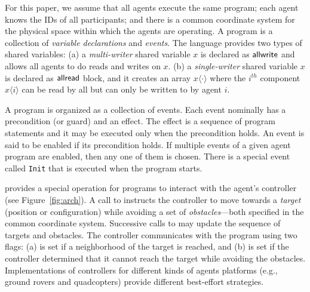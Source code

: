 For this paper, we assume that all agents execute the same \rolang program; each agent knows the IDs of all participants; and there is a common coordinate system for the physical space within which the agents are operating. 
%
A program is a collection of \emph{variable declarations} and \emph{events}. 
The language provides two types of shared variables:
(a) a {\em multi-writer} shared variable $x$ is declared as $\sf{allwrite}$ and allows all agents to do reads and writes on $x$. 
(b) a {\em single-writer\/} shared variable $x$ is declared as $\sf{allread}$ block, and it 
creates an array $x\langle \cdot \rangle$ 
where the $i^{th}$ component $x \langle i \rangle$ can be read by all but can only be written to by agent $i$.

A \rolang program is organized as a collection of events. Each event nominally has a precondition (or guard) and an effect. The effect is a sequence of program statements and it may be executed only when the precondition holds. An event is said to be enabled if its precondition holds. If multiple events of a given agent program are enabled, then any one of them is chosen.  
%
%
%
%
There is a special event called \verb|Init|
that is executed when the program starts. 
 
\rolang provides a special operation  for programs to interact with the agent's controller (see Figure~\ref{fig:arch}). 
A call to  instructs the controller to move towards a \emph{target} (position or configuration) while avoiding a set of \emph{obstacles}---both specified in the common coordinate system. Successive calls to  may update the sequence of targets and obstacles. 
%
The controller communicates with the program using two flags: (a)  is set if a neighborhood of the target is reached, and (b)  is set if the controller determined that it cannot reach the target while avoiding the obstacles. 
%
%
Implementations of  controllers for different kinds of agents platforms (e.g., ground rovers and quadcopters) provide different  best-effort strategies. 

